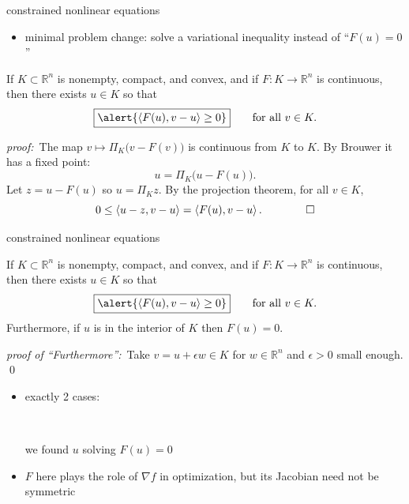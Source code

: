 \documentclass[aspectratio=169,10pt]{beamer}
\newcommand{\RR}{{\mathbb{R}}}
\newcommand{\eps}{\epsilon}
\newcommand{\grad}{\nabla}
\newcommand{\ip}[2]{\left\langle #1, #2 \right\rangle}
\begin{document}
\begin{frame}{constrained nonlinear equations}

\begin{itemize}
\item minimal problem change: solve a variational inequality instead of ``$F(u)=0$''
\end{itemize}

\medskip
\begin{theorem}
If $K\subset\mathbb{R}^n$ is nonempty, compact, and convex, and if $F:K \to\RR^n$ is continuous, then there exists $u\in K$ so that
    $$\boxed{\alert{\ip{F(u)}{v-u} \ge 0}} \qquad\text{for all } v\in K.$$
\end{theorem}

\emph{proof:}\, The map $v\mapsto \Pi_K\big(v-F(v)\big)$ is continuous from $K$ to $K$.  By
Brouwer it has a fixed point:
      $$u = \Pi_K \big(u - F(u)\big).$$
Let $z = u - F(u)$ so $u=\Pi_K z$.  By the projection theorem, for all $v\in K$,
      $$0 \le \ip{u - z}{v - u} = \ip{F(u)}{v-u}. \qquad\qed$$
\end{frame}


\begin{frame}{constrained nonlinear equations}

\begin{theorem}
If $K\subset\mathbb{R}^n$ is nonempty, compact, and convex, and if $F:K \to\RR^n$ is continuous, then there exists $u\in K$ so that
    $$\boxed{\alert{\ip{F(u)}{v-u} \ge 0}} \qquad\text{for all } v\in K.$$
\alert{Furthermore, if $u$ is in the interior of $K$ then $F(u)=0$}.
\end{theorem}

\emph{proof of ``Furthermore'':}\, Take \alert{$v = u+\eps w \in K$} for $w\in \RR^n$ and $\eps>0$ small enough. \qed

\bigskip
\begin{itemize}
\item exactly 2 cases:

\vspace{-10mm}

\hfill \mbox{ \hspace{30mm}  \hspace{25mm}}

\hfill {\small we found $u$ solving $F(u)=0$}  \hspace{8mm}

\medskip
\item $F$ here plays the role of $\grad f$ in optimization, but its Jacobian need not be symmetric
\end{itemize}
\end{frame}
\end{document}
